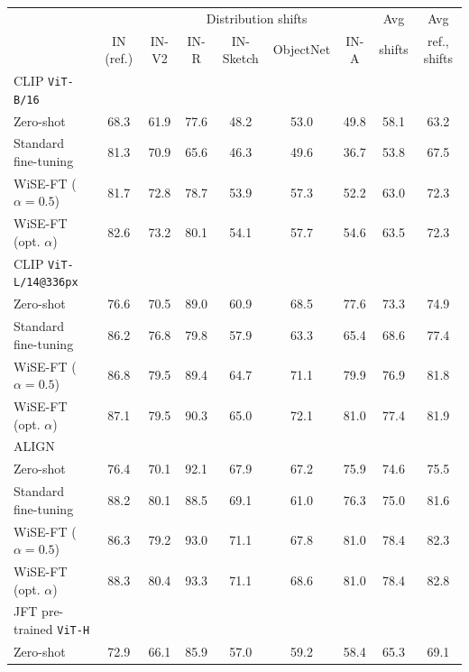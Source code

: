 \begin{table}
\setlength\tabcolsep{5.1pt}
\small
\begin{center}
\begin{tabular}{lc|ccccc|cc}
\toprule
{} &            &             \multicolumn{5}{c|}{Distribution shifts}             & Avg &     Avg\\
{} &           IN (ref.) &             IN-V2 &              IN-R &                 IN-Sketch &                 ObjectNet &              IN-A & shifts &     ref., shifts\\
\midrule
CLIP \texttt{ViT-B/16} \cite{radford2021learning} &  &  &  &  &  &  &  &  \\
\quad Zero-shot & 68.3 & 61.9 & 77.6 & 48.2 & 53.0 & 49.8 & 58.1 & 63.2 \\
\quad Standard fine-tuning & 81.3 & 70.9 & 65.6 & 46.3 & 49.6 & 36.7 & 53.8 & 67.5 \\
\quad WiSE-FT ($\alpha{=}0.5$) & 81.7 & 72.8 & 78.7 & 53.9 & 57.3 & 52.2 & 63.0 &  72.3 \\
\quad WiSE-FT (opt. $\alpha$) & 82.6 & 73.2 & 80.1 & 54.1 & 57.7 & 54.6 & 63.5 &  72.3 \\
CLIP \texttt{ViT-L/14@336px} \cite{radford2021learning} &  &  &  &  &  &  &  &  \\
\quad Zero-shot & 76.6 & 70.5 & 89.0 & 60.9 & 68.5 & 77.6 & 73.3 & 74.9 \\
\quad Standard fine-tuning & 86.2 & 76.8 & 79.8 & 57.9 & 63.3 & 65.4 &  68.6 & 77.4 \\
\quad WiSE-FT ($\alpha{=}0.5$) & 86.8 &  79.5 & 89.4 & 64.7 & 71.1 & 79.9 & 76.9 & 81.8 \\
\quad WiSE-FT (opt. $\alpha$) & 87.1 & 79.5 & 90.3 & 65.0 & 72.1 & 81.0 & 77.4 &  81.9 \\
ALIGN \cite{jia2021scaling} & & & & & & & & \\
\quad Zero-shot & 76.4 & 70.1 & 92.1 & 67.9 & 67.2 & 75.9 & 74.6 & 75.5 \\
\quad Standard fine-tuning & 88.2 & 80.1 & 88.5 & 69.1 & 61.0 & 76.3 & 75.0 & 81.6 \\
\quad WiSE-FT ($\alpha{=}0.5$) & 86.3 & 79.2 & 93.0 & 71.1 & 67.8 & 81.0 & 78.4 & 82.3 \\
\quad WiSE-FT (opt. $\alpha$) & 88.3 & 80.4 & 93.3 & 71.1 & 68.6 & 81.0 & 78.4 &  82.8 \\
JFT pre-trained \texttt{ViT-H} \cite{dosovitskiy2021an} &  &  &  &  &  &  &  &  \\
\quad Zero-shot & 72.9 & 66.1 & 85.9 & 57.0 & 59.2 & 58.4 & 65.3 & 69.1 \\

\end{tabular}
\end{center}
\end{table}
